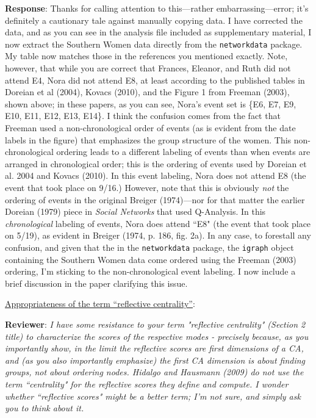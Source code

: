 \documentclass{article}
\begin{document}
\textbf{Response}: Thanks for calling attention to this---rather embarrassing---error; it's definitely a cautionary tale against manually copying data. I have corrected the data, and as you can see in the analysis file included as supplementary material, I now extract the Southern Women data directly from the \texttt{networkdata} package. My table now matches those in the references you mentioned exactly. Note, however, that while you are correct that Frances, Eleanor, and Ruth did not attend E4, Nora did not attend E8, at least according to the published tables in Doreian et al (2004), Kovacs (2010), and the Figure 1 from Freeman (2003), shown above; in these papers, as you can see, Nora's event set is \{E6, E7, E9, E10, E11, E12, E13, E14\}. I think the confusion comes from the fact that Freeman used a non-chronological order of events (as is evident from the date labels in the figure) that emphasizes the group structure of the women. This non-chronological ordering leads to a different labeling of events than when events are arranged in chronological order; this is the ordering of events used by Doreian et al. 2004 and Kovacs (2010). In this event labeling, Nora does not attend E8 (the event that took place on 9/16.) However, note that this is obviously \textit{not} the ordering of events in the original Breiger (1974)---nor for that matter the earlier Doreian (1979) piece in \textit{Social Networks} that used Q-Analysis. In this \textit{chronological} labeling of events, Nora does attend ``E8" (the event that took place on 5/19), as evident in Breiger (1974, p. 186, fig. 2a). In any case, to forestall any confusion, and given that the in the \texttt{networkdata} package, the \texttt{igraph} object containing the Southern Women data come ordered using the Freeman (2003) ordering, I'm sticking to the non-chronological event labeling. I now include a brief discussion in the paper clarifying this issue. 

\underline{Appropriateness of the term ``reflective centrality''}:

\textbf{Reviewer}: \textit{I have some resistance to your term "reflective centrality" (Section 2 title) to characterize the scores of the respective modes - precisely because, as you importantly show, in the limit the reflective scores are first dimensions of a CA, and (as you also importantly emphasize) the first CA dimension is about finding groups, not about ordering nodes. Hidalgo and Hausmann (2009) do not use the term ``centrality" for the reflective scores they define and compute. I wonder whether ``reflective scores" might be a better term; I'm not sure, and simply ask you to think about it.}
\end{document}
